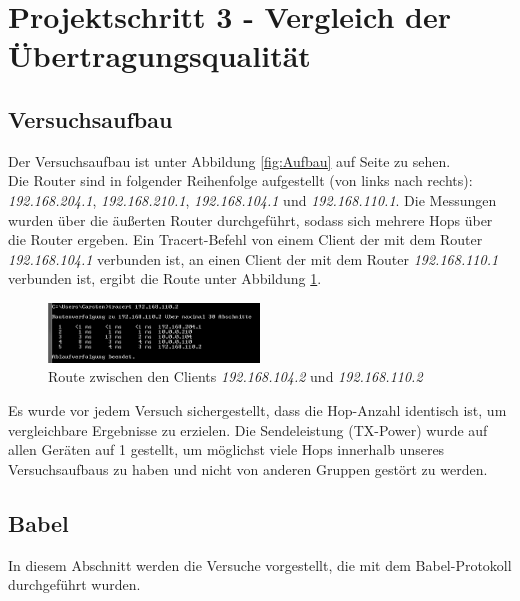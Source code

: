 \documentclass[10pt]{scrartcl}
\begin{document}
\section{Projektschritt 3 - Vergleich der Übertragungsqualität}

\subsection{Versuchsaufbau}
Der Versuchsaufbau ist unter Abbildung \ref{fig:Aufbau} auf Seite \pageref{fig:Aufbau} zu sehen.\\
Die Router sind in folgender Reihenfolge aufgestellt (von links nach rechts): \textit{192.168.204.1}, \textit{192.168.210.1}, \textit{192.168.104.1} und \textit{192.168.110.1}. Die Messungen wurden über die äußerten Router durchgeführt, sodass sich mehrere Hops über die Router ergeben. Ein Tracert-Befehl von einem Client der mit dem Router \textit{192.168.104.1} verbunden ist, an einen Client der mit dem Router \textit{192.168.110.1} verbunden ist, ergibt die Route unter Abbildung \ref{fig:Route}.

\begin{figure}[htbp]
	\centering	\includegraphics[width=0.5\textwidth]{Grafiken/Tracert.png}
	\caption{Route zwischen den Clients \textit{192.168.104.2} und \textit{192.168.110.2}}
	\label{fig:Route}
\end{figure}

Es wurde vor jedem Versuch sichergestellt, dass die Hop-Anzahl identisch ist, um vergleichbare Ergebnisse zu erzielen. Die Sendeleistung (TX-Power) wurde auf allen Geräten auf 1 gestellt, um möglichst viele Hops innerhalb unseres Versuchsaufbaus zu haben und nicht von anderen Gruppen gestört zu werden.

\subsection{Babel}
In diesem Abschnitt werden die Versuche vorgestellt, die mit dem Babel-Protokoll durchgeführt wurden.
\end{document}
